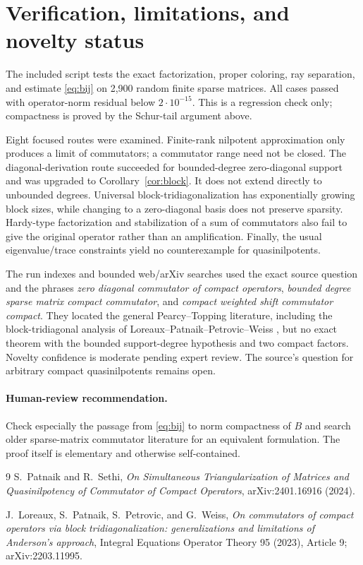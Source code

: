 \documentclass[11pt]{article}
\begin{document}
\section*{Verification, limitations, and novelty status}

The included script tests the exact factorization, proper coloring, ray
separation, and estimate \eqref{eq:bij} on 2,900 random finite sparse
matrices.  All cases passed with operator-norm residual below $2\cdot10^{-15}$.
This is a regression check only; compactness is proved by the Schur-tail
argument above.

Eight focused routes were examined.  Finite-rank nilpotent approximation
only produces a limit of commutators; a commutator range need not be closed.
The diagonal-derivation route succeeded for bounded-degree zero-diagonal
support and was upgraded to Corollary~\ref{cor:block}.  It does not extend
directly to unbounded degrees.  Universal block-tridiagonalization has
exponentially growing block sizes, while changing to a zero-diagonal basis
does not preserve sparsity.  Hardy-type factorization and stabilization of a
sum of commutators also fail to give the original operator rather than an
amplification.  Finally, the usual eigenvalue/trace constraints yield no
counterexample for quasinilpotents.

The run indexes and bounded web/arXiv searches used the exact source question
and the phrases \emph{zero diagonal commutator of compact operators},
\emph{bounded degree sparse matrix compact commutator}, and \emph{compact
weighted shift commutator compact}.  They located the general
Pearcy--Topping literature, including the block-tridiagonal analysis of
Loreaux--Patnaik--Petrovic--Weiss \cite{LPPW}, but no exact theorem with the
bounded support-degree hypothesis and two compact factors.  Novelty confidence
is moderate pending expert review.  The source's question for arbitrary
compact quasinilpotents remains open.

\paragraph{Human-review recommendation.}
Check especially the passage from \eqref{eq:bij} to norm compactness of $B$
and search older sparse-matrix commutator literature for an equivalent
formulation.  The proof itself is elementary and otherwise self-contained.

\begin{thebibliography}{9}
S.~Patnaik and R.~Sethi,
\emph{On Simultaneous Triangularization of Matrices and Quasinilpotency of
Commutator of Compact Operators}, arXiv:2401.16916 (2024).

J.~Loreaux, S.~Patnaik, S.~Petrovic, and G.~Weiss,
\emph{On commutators of compact operators via block tridiagonalization:
generalizations and limitations of Anderson's approach},
Integral Equations Operator Theory 95 (2023), Article 9;
arXiv:2203.11995.
\end{thebibliography}
\end{document}
